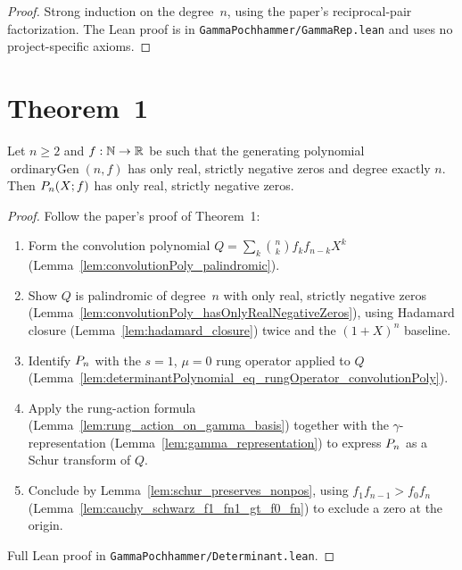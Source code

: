 \begin{proof}
  \leanok
  Strong induction on the degree~$n$, using the paper's reciprocal-pair
  factorization.  The Lean proof is in
  \texttt{GammaPochhammer/GammaRep.lean} and uses no project-specific
  axioms.
\end{proof}

\section{Theorem~1}

\begin{theorem}
  \label{thm:main}
  \leanok
  Let $n \geq 2$ and $f : \mathbb{N} \to \mathbb{R}$ be such that the generating
  polynomial $\operatorname{ordinaryGen}(n,f)$ has only real, strictly
  negative zeros and degree exactly $n$.  Then
  $P_n(X; f)$ has only real, strictly negative zeros.
\end{theorem}

\begin{proof}
  \leanok
  Follow the paper's proof of Theorem~1:
  \begin{enumerate}
    \item Form the convolution polynomial
          $Q = \sum_k \binom{n}{k} f_k f_{n-k} X^k$
          (Lemma~\ref{lem:convolutionPoly_palindromic}).
    \item Show $Q$ is palindromic of degree~$n$ with only real,
          strictly negative zeros
          (Lemma~\ref{lem:convolutionPoly_hasOnlyRealNegativeZeros}),
          using Hadamard closure (Lemma~\ref{lem:hadamard_closure})
          twice and the
          $(1+X)^n$ baseline.
    \item Identify $P_n$ with the $s=1$, $\mu=0$ rung operator applied
          to $Q$ (Lemma~\ref{lem:determinantPolynomial_eq_rungOperator_convolutionPoly}).
    \item Apply the rung-action formula
          (Lemma~\ref{lem:rung_action_on_gamma_basis})
          together with the $\gamma$-representation
          (Lemma~\ref{lem:gamma_representation}) to express $P_n$
          as a Schur transform of $Q$.
    \item Conclude by Lemma~\ref{lem:schur_preserves_nonpos}, using
          $f_1 f_{n-1} > f_0 f_n$
          (Lemma~\ref{lem:cauchy_schwarz_f1_fn1_gt_f0_fn})
          to exclude a zero at the origin.
  \end{enumerate}
  Full Lean proof in
  \texttt{GammaPochhammer/Determinant.lean}.
\end{proof}

